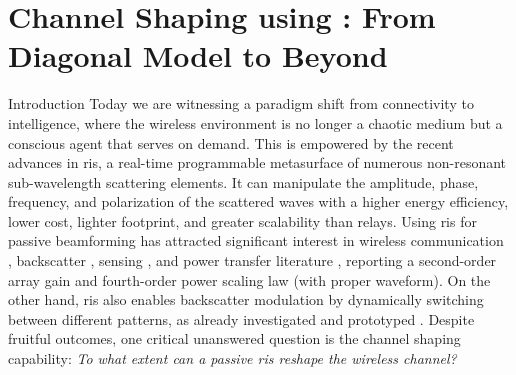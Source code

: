 
\graphicspath{{assets/chapter_5/}}

\chapter{Channel Shaping using : From Diagonal Model to Beyond}\label{ch:channel_shaping}




\begin{section}{Introduction}
	Today we are witnessing a paradigm shift from connectivity to intelligence, where the wireless environment is no longer a chaotic medium but a conscious agent that serves on demand.
	This is empowered by the recent advances in \gls{ris}, a real-time programmable metasurface of numerous non-resonant sub-wavelength scattering elements.
	It can manipulate the amplitude, phase, frequency, and polarization of the scattered waves \cite{Basar2019} with a higher energy efficiency, lower cost, lighter footprint, and greater scalability than relays.
	Using \gls{ris} for {passive beamforming} has attracted significant interest in wireless communication \cite{Wu2019,Wu2020c,Yang2020,Zheng2021}, backscatter \cite{Jia2020,Liang2022}, sensing \cite{Liu2022a,Hua2023}, and power transfer literature \cite{Wu2021d,Feng2022,Zhao2022}, reporting a second-order array gain and fourth-order power scaling law (with proper waveform).
	On the other hand, \gls{ris} also enables {backscatter modulation} by dynamically switching between different patterns, as already investigated \cite{Karasik2020,Basar2020,Zhao2022a} and prototyped \cite{Tang2019b,Dai2020a}.
	Despite fruitful outcomes, one critical unanswered question is the {channel shaping} capability: \emph{To what extent can a passive \gls{ris} reshape the wireless channel?}


\end{section}
